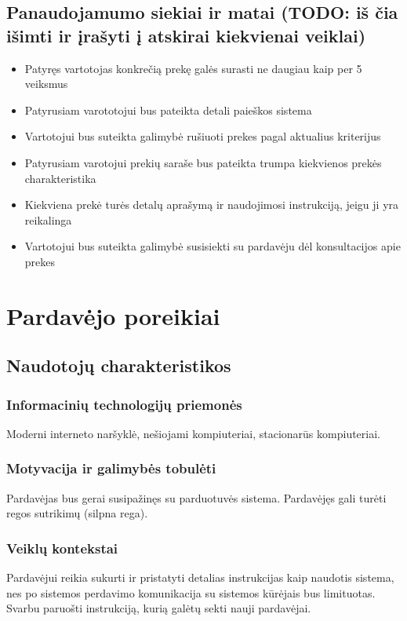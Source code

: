 \documentclass[oneside]{VUMIFPSkursinis}
\begin{document}
	\subsection{Panaudojamumo siekiai ir matai (TODO: iš čia išimti ir įrašyti į atskirai kiekvienai veiklai)}
		\begin{itemize}
			\item{Patyręs vartotojas konkrečią prekę galės surasti ne daugiau kaip per 5 veiksmus}
			\item{Patyrusiam varototojui bus pateikta detali paieškos sistema}
			\item{Vartotojui bus suteikta galimybė rušiuoti prekes pagal aktualius kriterijus}
			\item{Patyrusiam varotojui prekių saraše bus pateikta trumpa kiekvienos prekės charakteristika}
			\item{Kiekviena prekė turės detalų aprašymą ir naudojimosi instrukciją, jeigu ji yra reikalinga}
			\item{Vartotojui bus suteikta galimybė susisiekti su pardavėju dėl konsultacijos apie prekes}
		\end{itemize}
	\fi
\section{Pardavėjo poreikiai}
	\subsection{Naudotojų charakteristikos}
		\subsubsection{Informacinių technologijų priemonės}
			Moderni interneto naršyklė, nešiojami kompiuteriai, stacionarūs kompiuteriai.
		\subsubsection{Motyvacija ir galimybės tobulėti}
			Pardavėjas bus gerai susipažinęs su parduotuvės sistema. Pardavėjęs gali turėti regos sutrikimų (silpna rega).
		\subsubsection{Veiklų kontekstai}
			Pardavėjui reikia sukurti ir pristatyti detalias instrukcijas kaip naudotis sistema, nes po sistemos perdavimo komunikacija su sistemos kūrėjais bus limituotas. Svarbu paruošti instrukciją, kurią galėtų sekti nauji pardavėjai.
\end{document}

